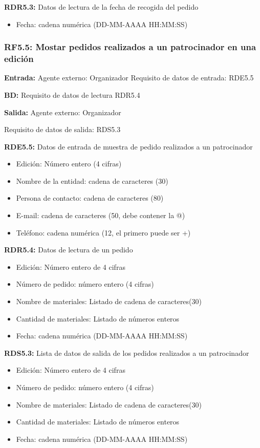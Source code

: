\textbf{RDR5.3:} Datos de lectura de la fecha de recogida del pedido
\begin{itemize}
	\item Fecha: cadena numérica (DD-MM-AAAA HH:MM:SS)
\end{itemize}

\subsubsection{RF5.5: Mostar pedidos realizados a un patrocinador en una edición}

\textbf{Entrada:} Agente externo: Organizador    Requisito de datos de entrada: RDE5.5

\textbf{BD:} Requisito de datos de lectura RDR5.4

\textbf{Salida:} Agente externo: Organizador

Requisito de datos de salida: RDS5.3

\textbf{RDE5.5:} Datos de entrada de muestra de pedido realizados a un patrocinador
\begin{itemize}
	\item Edición: Número entero (4 cifras)
\newline
	\item Nombre de la entidad: cadena de caracteres (30)
	\item Persona de contacto: cadena de caracteres (80)
	\item E-mail: cadena de caracteres (50, debe contener la @)
	\item Teléfono: cadena numérica (12, el primero puede ser +)
\end{itemize}

\textbf{RDR5.4:} Datos de lectura de un pedido
\begin{itemize}
	\item Edición: Número entero de 4 cifras
\newline
	\item Número de pedido: número entero (4 cifras)
	\item Nombre de materiales: Listado de cadena de caracteres(30)
	\item Cantidad de materiales: Listado de números enteros
	\item Fecha: cadena numérica (DD-MM-AAAA HH:MM:SS)
\end{itemize}

\textbf{RDS5.3:} Lista de datos de salida de los pedidos realizados a un patrocinador
\begin{itemize}
	\item Edición: Número entero de 4 cifras
\newline
	\item Número de pedido: número entero (4 cifras)
	\item Nombre de materiales: Listado de cadena de caracteres(30)
	\item Cantidad de materiales: Listado de números enteros
	\item Fecha: cadena numérica (DD-MM-AAAA HH:MM:SS)
\end{itemize}

